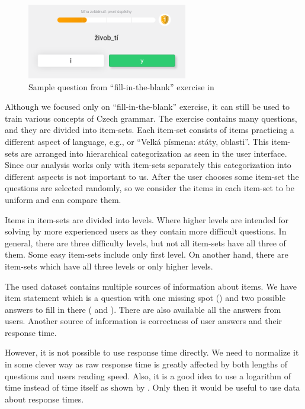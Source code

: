 \documentclass[
  digital, %
  table,   %
  nolof,     %
  nolot,     %
  nocover,
  color,
  final, %
]{fithesis3}
\begin{document}
\begin{figure}
  \includegraphics[width=7cm]{img/umimecesky_doplnovacka}
  \caption{Sample question from ``fill-in-the-blank'' exercise in \umimeCesky{}}
  \label{fig:umimecesky_doplnovacka}
\end{figure}

Although we focused only on ``fill-in-the-blank'' exercise, it can still be used to train various concepts of Czech grammar. The exercise contains many questions, and they are divided into item-sets. Each item-set consists of items practicing a different aspect of language, e.g., \cvicenieB{} or ``Velká písmena: státy, oblasti''. This item-sets are arranged into hierarchical categorization as seen in the user interface. Since our analysis works only with item-sets separately this categorization into different aspects is not important to us. After the user chooses some item-set the questions are selected randomly, so we consider the items in each item-set to be uniform and can compare them.

Items in item-sets are divided into levels. Where higher levels are intended for solving by more experienced users as they contain more difficult questions. In general, there are three difficulty levels, but not all item-sets have all three of them. Some easy item-sets include only first level. On another hand, there are item-sets which have all three levels or only higher levels.


The used dataset contains multiple sources of information about items. We have item statement which is a question with one missing spot () and two possible answers to fill in there ( and ). There are also available all the answers from users. Another source of information is correctness of user answers and their response time.

However, it is not possible to use response time directly. We need to normalize it in some clever way as raw response time is greatly affected by both lengths of questions and users reading speed. Also, it is a good idea to use a logarithm of time instead of time itself as shown by \citeauthor{niznan2014using}\cite{niznan2014using}. Only then it would be useful to use data about response times.
\end{document}
